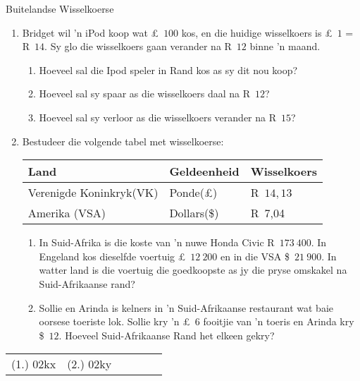 \begin{exercises}{Buitelandse Wisselkoerse}
{
    \begin{enumerate}[label=\textbf{\arabic*}.]
	\item Bridget wil ’n iPod koop wat £~$100$ kos, en die huidige wisselkoers is £~$1$ = R~$14$. Sy glo die wisselkoers gaan verander na R~$12$ binne ’n maand.
	\begin{enumerate}[label=\textbf{(\alph*)}]
	    \item Hoeveel sal die Ipod speler in Rand kos as sy dit nou koop?
	    \item Hoeveel sal sy spaar as die wisselkoers daal na R~$12$?
	    \item Hoeveel sal sy verloor as die wisselkoers verander na R~$15$?
	\end{enumerate}

	\item Bestudeer die volgende tabel met wisselkoerse:
	\begin{center}
	    \begin{tabular}{ |l|l|l| }
		\hline
		\textbf{Land}	&	\textbf{Geldeenheid} 	&	\textbf{Wisselkoers}\\ \hline
		Verenigde Koninkryk(VK) 	&	Ponde(£)	&	R~$14,13$\\ \hline
		Amerika (VSA) 	&	Dollars(\$)	&	R~7,04\\ \hline
	    \end{tabular}
	\end{center}
	
	\begin{enumerate}[label=\textbf{(\alph*)}]
	    \item In Suid-Afrika is die koste van ’n nuwe Honda Civic R~$173~400$. In Engeland kos dieselfde voertuig £~$12~200$ en in die VSA \$~$21~900$. In watter land is die voertuig die goedkoopste as jy die pryse omskakel na Suid-Afrikaanse rand?

	    \item Sollie en Arinda is kelners in ’n Suid-Afrikaanse restaurant wat baie oorsese toeriste lok. Sollie kry ’n £~$6$ fooitjie van ’n toeris en Arinda kry \$~$12$.  Hoeveel Suid-Afrikaanse Rand het elkeen gekry?
	\end{enumerate}
    \end{enumerate}

\par \practiceinfo
\par \begin{tabular}[h]{cccccc}
(1.)	02kx	&
(2.)	02ky	&
\end{tabular}
}
\end{exercises}


